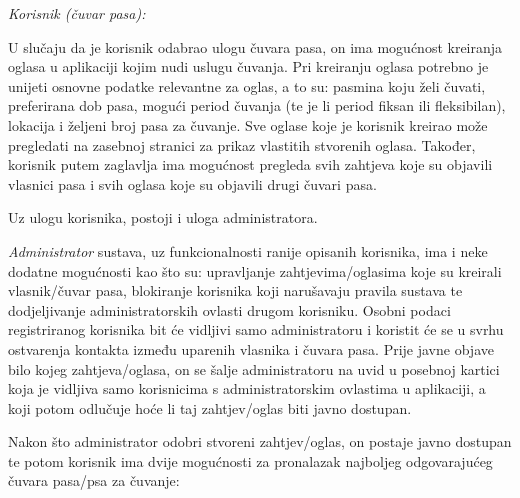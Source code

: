 		\textit{Korisnik (čuvar pasa):}
		
		U slučaju da je korisnik odabrao ulogu čuvara pasa, on ima mogućnost kreiranja oglasa u aplikaciji kojim nudi uslugu čuvanja. Pri kreiranju oglasa potrebno je unijeti osnovne podatke relevantne za oglas, a to su: pasmina koju želi čuvati, preferirana dob pasa, mogući period čuvanja (te je li period fiksan ili fleksibilan), lokacija i željeni broj pasa za čuvanje. Sve oglase koje je korisnik kreirao može pregledati na zasebnoj stranici za prikaz vlastitih stvorenih oglasa. Također, korisnik putem zaglavlja ima mogućnost pregleda svih zahtjeva koje su objavili vlasnici pasa i svih oglasa koje su objavili drugi čuvari pasa.
		
		Uz ulogu korisnika, postoji i uloga administratora.
		
		\textit{Administrator} sustava, uz funkcionalnosti ranije opisanih korisnika, ima i neke dodatne mogućnosti kao što su: upravljanje zahtjevima/oglasima koje su kreirali vlasnik/čuvar pasa, blokiranje korisnika koji narušavaju pravila sustava te dodjeljivanje administratorskih ovlasti drugom korisniku. Osobni podaci registriranog korisnika bit će vidljivi samo administratoru i koristit će se u svrhu ostvarenja kontakta između uparenih vlasnika i čuvara pasa. Prije javne objave bilo kojeg zahtjeva/oglasa, on se šalje administratoru na uvid u posebnoj kartici koja je vidljiva samo korisnicima s administratorskim ovlastima u aplikaciji, a koji potom odlučuje hoće li taj zahtjev/oglas biti javno dostupan.
		
		Nakon što administrator odobri stvoreni zahtjev/oglas, on postaje javno dostupan te potom korisnik ima dvije mogućnosti za pronalazak najboljeg odgovarajućeg čuvara pasa/psa za čuvanje:
		
